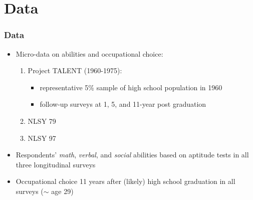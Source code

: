 \documentclass[11pt,hyperref={bookmarks=false},table,aspectratio=169]{beamer}
\begin{document}

\section{Data}	
\begin{frame}
\frametitle{Data}
\begin{itemize}
	\item Micro-data on abilities and occupational choice:
	\begin{enumerate}
		\item Project TALENT (1960-1975):
		\begin{itemize}
			\item representative 5\% sample of high school population in 1960
			\item follow-up surveys at 1, 5, and 11-year post graduation
		\end{itemize}
		\item NLSY 79
		\item NLSY 97
	\end{enumerate}
	\item Respondents' \textit{math}, \textit{verbal}, and \textit{social} abilities based on aptitude tests in all three longitudinal surveys
	\item Occupational choice 11 years after (likely) high school graduation in all surveys ($\sim$ age 29)
\end{itemize}
\end{frame}

\end{document}
